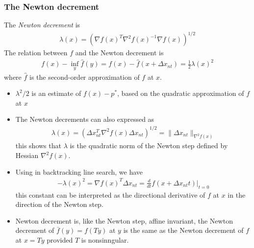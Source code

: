 \subsubsection{The Newton decrement}
The \textit{Newton decrement} is
\begin{align*}
  \lambda(x)=(\nabla f(x)^T\nabla^2 f(x)^{-1}\nabla f(x))^{1/2}
\end{align*}
The relation between $f$ and the Newton decrement is
\begin{align*}
  f(x)-\inf_y\hat{f}(y)=f(x)-\hat{f}(x+\Delta x_{nt})=\frac{1}{2}\lambda(x)^2
\end{align*}
where $\hat{f}$ is the second-order approximation of $f$ at $x$.
\begin{itemize}
  \item $\lambda^2/2$ is an estimate of $f(x)-p^\ast$, based on the quadratic approximation of $f$ at $x$
  \item The Newton decrements can also expressed as
        \begin{align}
          \lambda(x)=(\Delta x_{nt}^T\nabla^2f(x)\Delta x_{nt})^{1/2}=\|\Delta x_{nt}\|_{\nabla^2f(x)}\label{eq:9.29}
        \end{align}
        this shows that $\lambda$ is the quadratic norm of the Newton step defined by Hessian $\nabla^2f(x)$.
  \item Using in backtracking line search, we have
        \begin{align}
          -\lambda(x)^2=\nabla f(x)^T\Delta x_{nt}=\frac{d}{dt}f(x+\Delta x_{nt}t)|_{t=0}\label{eq:9.30}
        \end{align}
        this constant can be interpreted as the directional derivative of $f$ at $x$ in the direction of the Newton step.
  \item Newton decrement is, like the Newton step, affine invariant, \ie the Newton decrement of $\bar{f}(y)=f(Ty)$ at $y$ is the same as the Newton decrement of $f$ at $x=Ty$ provided $T$ is nonsinngular.
\end{itemize}


